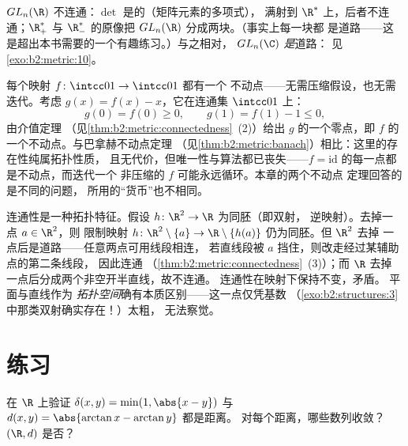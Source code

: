\begin{example}\label{ex:b2:metric:glnr}
$GL_n(\R)$ 不连通：$\det$ 是的（矩阵元素的多项式），
满射到 $\R^*$ 上，后者不连通；$\R_+^*$ 与
$\R_-^*$ 的原像把 $GL_n(\R)$ 分成两块。（事实上每一块都
是道路——这是超出本书需要的一个有趣练习。）与之相对，
$GL_n(\C)$ \emph{是}道路：
见\cref{exo:b2:metric:10}。
\end{example}

\begin{example}[仅由连通性得到的不动点]\label{ex:b2:metric:ivtfixed}
每个映射 $f \colon \intcc01 \to \intcc01$ 都有一个
不动点——无需压缩假设，也无需迭代。考虑
$g(x) = f(x) - x$，它在连通集 $\intcc01$ 上：
\[
g(0) = f(0) \geq 0,
\qquad
g(1) = f(1) - 1 \leq 0 ,
\]
由介值定理
（见\cref{thm:b2:metric:connectedness}~(2)）给出
$g$ 的一个零点，即 $f$ 的一个不动点。与巴拿赫不动点定理
（见\cref{thm:b2:metric:banach}）相比：这里的存在性纯属拓扑性质，
且无代价，但唯一性与算法都已丧失——$f =
\mathrm{id}$ 的每一点都是不动点，而迭代一个
非压缩的 $f$ 可能永远循环。本章的两个不动点
定理回答的是不同的问题，
所用的“货币”也不相同。
\end{example}

\begin{example}[$\R$ 与 $\R^2$ 不同胚]\label{ex:b2:metric:rnotr2}
连通性是一种拓扑特征。假设 $h \colon
\R^2 \to \R$ 为同胚（即双射，
逆映射）。去掉一点 $a \in \R^2$，则
限制映射 $h \colon \R^2\setminus\{a\} \to
\R\setminus\{h(a)\}$ 仍为同胚。但 $\R^2$ 去掉
一点后是道路——任意两点可用线段相连，
若直线段被 $a$ 挡住，则改走经过某辅助点的第二条线段，
因此连通
（\cref{thm:b2:metric:connectedness}~(3)）；而 $\R$ 去掉
一点后分成两个非空开半直线，故不连通。
连通性在映射下保持不变，矛盾。
平面与直线作为\emph{
拓扑空间}确有本质区别——这一点仅凭基数
（\cref{exo:b2:structures:3}中那类双射确实存在！）太粗，
无法察觉。
\end{example}

\section{练习}

\begin{exercise}[$\star$]\label{exo:b2:metric:1}
在 $\R$ 上验证 $\delta(x, y) = \min(1, \abs{x - y})$ 与
$d(x,y) = \abs{\arctan x - \arctan y}$ 都是距离。
对每个距离，哪些数列收敛？$(\R, d)$ 是否？
\end{exercise}

